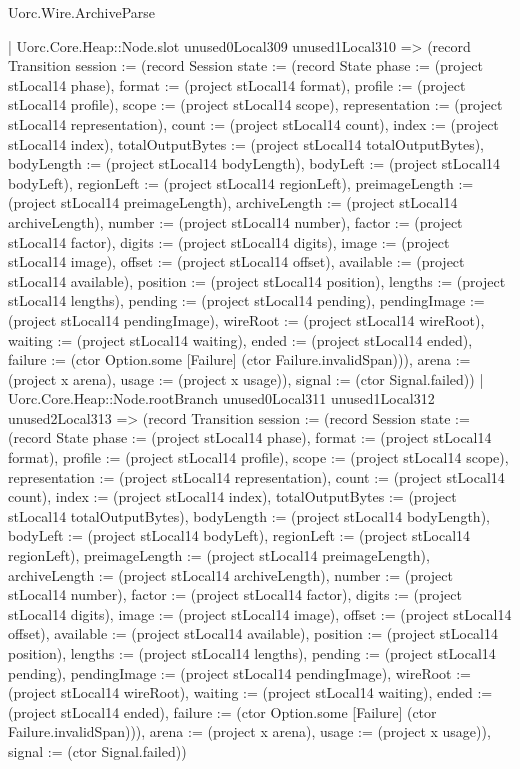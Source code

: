 \begin{lexlean}{Uorc.Wire.ArchiveParse}
\begin{semanticmodule}
{            | Uorc.Core.Heap::Node.slot unused0Local309 unused1Local310 => (record Transition {session := (record Session {state := (record State {phase := (project stLocal14 phase), format := (project stLocal14 format), profile := (project stLocal14 profile), scope := (project stLocal14 scope), representation := (project stLocal14 representation), count := (project stLocal14 count), index := (project stLocal14 index), totalOutputBytes := (project stLocal14 totalOutputBytes), bodyLength := (project stLocal14 bodyLength), bodyLeft := (project stLocal14 bodyLeft), regionLeft := (project stLocal14 regionLeft), preimageLength := (project stLocal14 preimageLength), archiveLength := (project stLocal14 archiveLength), number := (project stLocal14 number), factor := (project stLocal14 factor), digits := (project stLocal14 digits), image := (project stLocal14 image), offset := (project stLocal14 offset), available := (project stLocal14 available), position := (project stLocal14 position), lengths := (project stLocal14 lengths), pending := (project stLocal14 pending), pendingImage := (project stLocal14 pendingImage), wireRoot := (project stLocal14 wireRoot), waiting := (project stLocal14 waiting), ended := (project stLocal14 ended), failure := (ctor Option.some [Failure] (ctor Failure.invalidSpan))}), arena := (project x arena), usage := (project x usage)}), signal := (ctor Signal.failed)})
            | Uorc.Core.Heap::Node.rootBranch unused0Local311 unused1Local312 unused2Local313 => (record Transition {session := (record Session {state := (record State {phase := (project stLocal14 phase), format := (project stLocal14 format), profile := (project stLocal14 profile), scope := (project stLocal14 scope), representation := (project stLocal14 representation), count := (project stLocal14 count), index := (project stLocal14 index), totalOutputBytes := (project stLocal14 totalOutputBytes), bodyLength := (project stLocal14 bodyLength), bodyLeft := (project stLocal14 bodyLeft), regionLeft := (project stLocal14 regionLeft), preimageLength := (project stLocal14 preimageLength), archiveLength := (project stLocal14 archiveLength), number := (project stLocal14 number), factor := (project stLocal14 factor), digits := (project stLocal14 digits), image := (project stLocal14 image), offset := (project stLocal14 offset), available := (project stLocal14 available), position := (project stLocal14 position), lengths := (project stLocal14 lengths), pending := (project stLocal14 pending), pendingImage := (project stLocal14 pendingImage), wireRoot := (project stLocal14 wireRoot), waiting := (project stLocal14 waiting), ended := (project stLocal14 ended), failure := (ctor Option.some [Failure] (ctor Failure.invalidSpan))}), arena := (project x arena), usage := (project x usage)}), signal := (ctor Signal.failed)})
}
\end{semanticmodule}
\end{lexlean}

